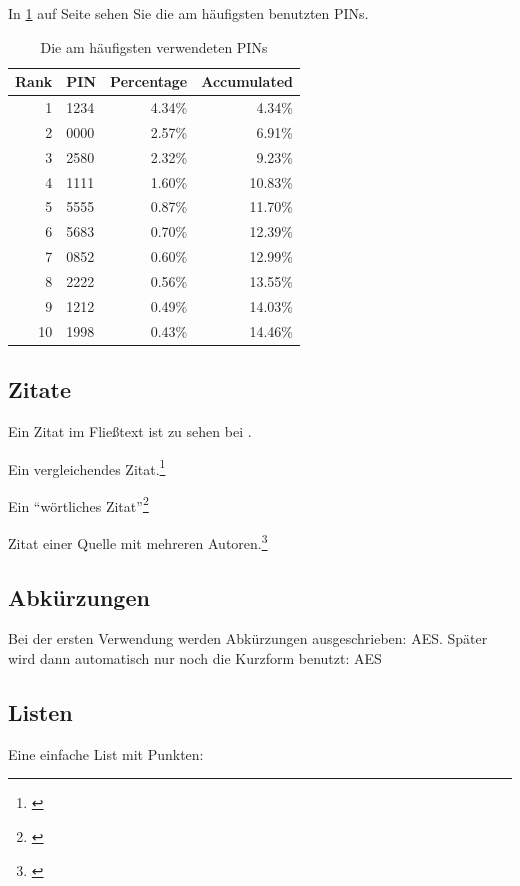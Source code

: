 In \cref{tab:pin} auf Seite \pageref{tab:pin} sehen Sie die am häufigsten benutzten PINs.

\begin{table}[hbt]
\centering
\begin{minipage}[t]{.5\textwidth} %
\caption{Die am häufigsten verwendeten PINs} %
\begin{tabularx}{\columnwidth}{rXrr}
\toprule
Rank & PIN & Percentage & Accumulated \\
\midrule
1 & 1234 & 4.34\% & 4.34\%\\
2 & 0000 & 2.57\% & 6.91\%\\
3 & 2580 & 2.32\% & 9.23\%\\
4 & 1111 & 1.60\% & 10.83\%\\
5 & 5555 & 0.87\% & 11.70\%\\
6 & 5683 & 0.70\% & 12.39\%\\
7 & 0852 & 0.60\% & 12.99\%\\
8 & 2222 & 0.56\% & 13.55\%\\
9 & 1212 & 0.49\% & 14.03\%\\
10 & 1998 & 0.43\% & 14.46\%\\
\bottomrule
\end{tabularx}
\label{tab:pin}
\end{minipage}
\end{table}

\subsection{Zitate}

Ein Zitat im Fließtext ist zu sehen bei \citet{Fuller2011}.

Ein vergleichendes Zitat.\footnote{\cite[vgl.][5\psqq]{Maslennikov2011}}

Ein \enquote{wörtliches Zitat}\footnote{\cite[13\psq]{Meier2010}}

Zitat einer Quelle mit mehreren Autoren.\footnote{\cite[vgl.][32\psqq]{Hocking2011a}}


\subsection{Abkürzungen}
Bei der ersten Verwendung werden Abkürzungen ausgeschrieben: \gls{AES}.
Später wird dann automatisch nur noch die Kurzform benutzt: \gls{AES}


\subsection{Listen}
\label{sec:Listen}
Eine einfache List mit Punkten:


